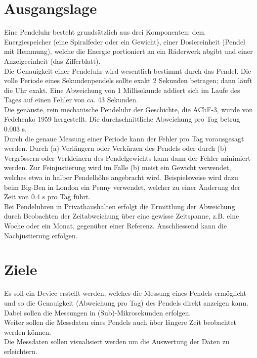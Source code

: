\section{Ausgangslage}%
Eine Pendeluhr besteht grundsätzlich aus drei Komponenten: dem Energiespeicher (eine Spiralfeder
oder ein Gewicht), einer Dosiereinheit (Pendel mit Hemmung), welche die Energie portioniert an ein
Räderwerk abgibt und einer Anzeigeeinheit (das Zifferblatt).\\
Die Genauigkeit einer Pendeluhr wird wesentlich bestimmt durch das Pendel. Die volle Periode eines Sekundenpendels sollte exakt 2 Sekunden betragen; dann läuft die Uhr exakt. Eine Abweichung von 1 Millisekunde addiert sich im Laufe des Tages auf einen Fehler von ca. 43 Sekunden.\\
Die genauste, rein mechanische Pendeluhr der Geschichte, die AChF-3, wurde von Fedchenko 1959
hergestellt. Die durchschnittliche Abweichung pro Tag betrug 0.003 s.\\
Durch die genaue Messung einer Periode kann der Fehler pro Tag vorausgesagt werden. Durch (a)
Verlängern oder Verkürzen des Pendels oder durch (b) Vergrössern oder Verkleinern des
Pendelgewichts kann dann der Fehler minimiert werden. Zur Feinjustierung wird im Falle (b) meist ein
Gewicht verwendet, welches etwa in halber Pendelhöhe angebracht wird. Beispielsweise wird dazu
beim Big-Ben in London ein \glqq{}Penny\grqq{} verwendet, welcher zu einer Änderung der Zeit von 0.4 s pro Tag führt.\\
Bei Pendeluhren in Privathaushalten erfolgt die Ermittlung der Abweichung durch Beobachten der Zeitabweichung über eine gewisse Zeitspanne, z.B. eine Woche oder ein Monat, gegenüber einer Referenz. Anschliessend kann die Nachjustierung erfolgen. 

\section{Ziele}
Es soll ein Device erstellt werden, welches die Messung eines Pendels ermöglicht und so die Genauigkeit (Abweichung pro Tag) des Pendels direkt anzeigen kann.\\
Dabei sollen die Messungen in (Sub)-Mikrosekunden erfolgen.\\
Weiter sollen die Messdaten eines Pendels auch über längere Zeit beobachtet werden können.\\
Die Messdaten sollen visualisiert werden um die Auswertung der Daten zu erleichtern.

